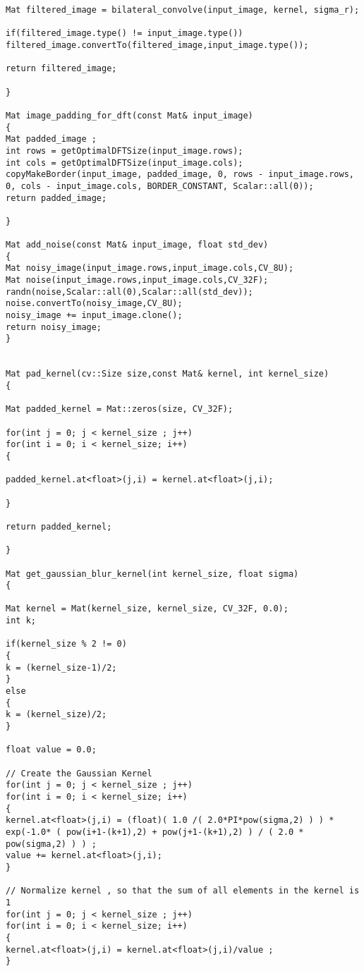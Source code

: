 \begin{lstlisting}
Mat filtered_image = bilateral_convolve(input_image, kernel, sigma_r);

if(filtered_image.type() != input_image.type())
filtered_image.convertTo(filtered_image,input_image.type());  

return filtered_image;

}

Mat image_padding_for_dft(const Mat& input_image)
{
Mat padded_image ;
int rows = getOptimalDFTSize(input_image.rows);
int cols = getOptimalDFTSize(input_image.cols);
copyMakeBorder(input_image, padded_image, 0, rows - input_image.rows, 0, cols - input_image.cols, BORDER_CONSTANT, Scalar::all(0));
return padded_image;

}

Mat add_noise(const Mat& input_image, float std_dev)
{
Mat noisy_image(input_image.rows,input_image.cols,CV_8U);
Mat noise(input_image.rows,input_image.cols,CV_32F);
randn(noise,Scalar::all(0),Scalar::all(std_dev));
noise.convertTo(noisy_image,CV_8U);
noisy_image += input_image.clone();
return noisy_image;
}


Mat pad_kernel(cv::Size size,const Mat& kernel, int kernel_size)
{

Mat padded_kernel = Mat::zeros(size, CV_32F);

for(int j = 0; j < kernel_size ; j++)
for(int i = 0; i < kernel_size; i++)
{

padded_kernel.at<float>(j,i) = kernel.at<float>(j,i);

}

return padded_kernel;

}

Mat get_gaussian_blur_kernel(int kernel_size, float sigma)
{

Mat kernel = Mat(kernel_size, kernel_size, CV_32F, 0.0);
int k;

if(kernel_size % 2 != 0)
{
k = (kernel_size-1)/2;
}
else
{
k = (kernel_size)/2;
}

float value = 0.0;

// Create the Gaussian Kernel
for(int j = 0; j < kernel_size ; j++)
for(int i = 0; i < kernel_size; i++)
{
kernel.at<float>(j,i) = (float)( 1.0 /( 2.0*PI*pow(sigma,2) ) ) * exp(-1.0* ( pow(i+1-(k+1),2) + pow(j+1-(k+1),2) ) / ( 2.0 * pow(sigma,2) ) ) ;
value += kernel.at<float>(j,i);
}

// Normalize kernel , so that the sum of all elements in the kernel is 1
for(int j = 0; j < kernel_size ; j++)
for(int i = 0; i < kernel_size; i++)
{
kernel.at<float>(j,i) = kernel.at<float>(j,i)/value ;
}


\end{lstlisting}
